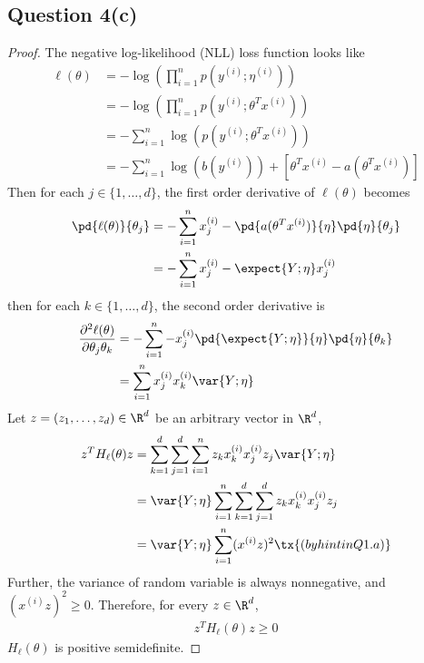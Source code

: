 \documentclass[11pt]{article}
\newcommand{\upi}[0]{^{(i)}}
\begin{document}
	\newpage
	\subsection{Question 4(c)}
	\begin{proof}
		The negative log-likelihood (NLL) loss function looks like
		\begin{align}
			\ell(\theta) &= - \log \left(
				\prod_{i=1}^n p(y\upi; \eta\upi)
			\right) \\
			&= - \log \left(
				\prod_{i=1}^n p(y\upi; \theta^T x\upi)
			\right) \\
			&= - \sum_{i=1}^n \log(p(y\upi; \theta^T x\upi)) \\
			&= - \sum_{i=1}^n \log (b(y\upi)) + [\theta^T x\upi - a(\theta^T x\upi)]
		\end{align}
		Then for each $j \in \{1, \dots, d\}$, the first order derivative of $\ell(\theta)$ becomes
		\begin{align}
			\pd{\ell(\theta)}{\theta_j} &= - \sum_{i=1}^n x\upi_j - \pd{a(\theta^T x\upi)}{\eta} \pd{\eta}{\theta_j} \\
			&= - \sum_{i=1}^n x\upi_j - \expect{Y; \eta} x\upi_j
		\end{align}
		then for each $k \in \{1, \dots, d\}$, the second order derivative is 
		\begin{align}
			\frac{\partial^2 \ell(\theta)}{\partial \theta_j \theta_k} &= - \sum_{i=1}^n - x_j\upi \pd{\expect{Y; \eta}}{\eta} \pd{\eta}{\theta_k} \\
			&= \sum_{i=1}^n x_j\upi x_k\upi \var{Y; \eta}
		\end{align}
		Let $z = (z_1, \dots, z_d) \in \R^d$ be an arbitrary vector in $\R^d$, 
		\begin{align}
			z^T H_\ell (\theta) z &= \sum_{k=1}^d \sum_{j=1}^d \sum_{i=1}^n z_k x\upi_k x\upi_j z_j \var{Y; \eta} \\
			&= \var{Y; \eta} \sum_{i=1}^n \sum_{k=1}^d \sum_{j=1}^d z_k x\upi_k x\upi_j z_j \\
			&= \var{Y; \eta} \sum_{i=1}^n (x\upi z)^2 \tx{ (by hint in Q1.a)}
		\end{align}
		Further, the variance of random variable is always nonnegative, and $(x\upi z)^2 \geq 0$. Therefore, for every $z \in \R^d$, 
		\begin{align}
			z^T H_\ell (\theta) z \geq 0
		\end{align}
		$H_\ell (\theta)$ is positive semidefinite.
	\end{proof}
	
	\newpage
\end{document}
